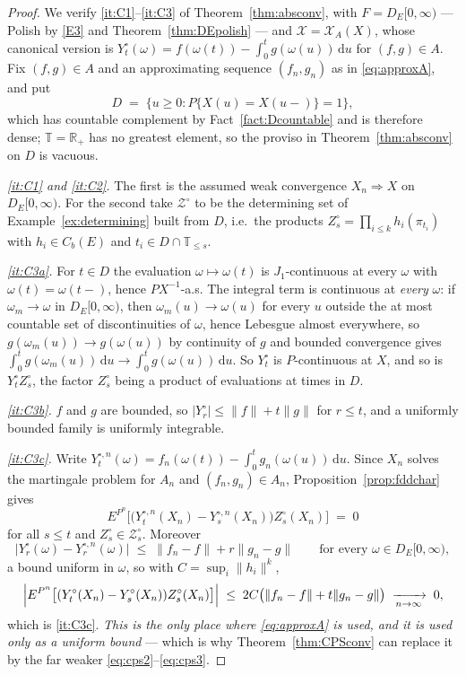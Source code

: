 \documentclass[11pt,a4paper]{article}
\theoremstyle{plain}
\theoremstyle{definition}
\theoremstyle{remark}
\newcommand{\R}{\mathbb{R}}
\newcommand{\Rp}{\R_+}
\newcommand{\T}{\mathbb{T}}                     %
\newcommand{\Cb}{C_b}                          %
\newcommand{\DE}{D_E[0,\infty)}
\newcommand{\XX}{\mathcal{X}}                  %
\newcommand{\ZZ}{\mathcal{Z}}                  %
\newcommand{\dif}{\,\mathrm{d}}
\DeclareMathOperator*{\wto}{\Rightarrow}
\begin{document}
\begin{proof}
  We verify \ref{it:C1}--\ref{it:C3} of Theorem~\ref{thm:absconv}, with
  $F = \DE$ --- Polish by \eqref{E3} and Theorem~\ref{thm:DEpolish} --- and
  $\XX = \XX_A(X)$, whose canonical version is
  $Y^\circ_t(\omega) = f(\omega(t)) - \int_0^t g(\omega(u))\dif u$ for
  $(f,g) \in A$.  Fix $(f,g) \in A$ and an approximating sequence $(f_n,g_n)$ as
  in \eqref{eq:approxA}, and put
  \[
    D \;=\; \{ u \geq 0 : P\{X(u) = X(u-)\} = 1 \} ,
  \]
  which has countable complement by Fact~\ref{fact:Dcountable} and is therefore
  dense; $\T = \Rp$ has no greatest element, so the proviso in
  Theorem~\ref{thm:absconv} on $D$ is vacuous.

  \emph{\ref{it:C1} and \ref{it:C2}.}  The first is the assumed weak convergence
  $X_n \wto X$ on $\DE$.  For the second take $\ZZ^\circ$ to be the determining
  set of Example~\ref{ex:determining} built from $D$, i.e.\ the products
  $Z^\circ_s = \prod_{i \leq k} h_i(\pi_{t_i})$ with $h_i \in \Cb(E)$ and
  $t_i \in D \cap \T_{\leq s}$.

  \emph{\ref{it:C3a}.}  For $t \in D$ the evaluation $\omega \mapsto \omega(t)$ is
  $J_1$-continuous at every $\omega$ with $\omega(t) = \omega(t-)$, hence
  $P X^{-1}$-a.s.  The integral term is continuous at \emph{every} $\omega$: if
  $\omega_m \to \omega$ in $\DE$, then $\omega_m(u) \to \omega(u)$ for every $u$
  outside the at most countable set of discontinuities of $\omega$, hence Lebesgue
  almost everywhere, so $g(\omega_m(u)) \to g(\omega(u))$ by continuity of $g$ and
  bounded convergence gives
  $\int_0^t g(\omega_m(u))\dif u \to \int_0^t g(\omega(u))\dif u$.  So $Y^\circ_t$
  is $P$-continuous at $X$, and so is $Y^\circ_t Z^\circ_s$, the factor
  $Z^\circ_s$ being a product of evaluations at times in $D$.

  \emph{\ref{it:C3b}.}  $f$ and $g$ are bounded, so
  $|Y^\circ_r| \leq \lVert f\rVert + t\lVert g\rVert$ for $r \leq t$, and a
  uniformly bounded family is uniformly integrable.

  \emph{\ref{it:C3c}.}  Write
  $Y^{\circ,n}_t(\omega) = f_n(\omega(t)) - \int_0^t g_n(\omega(u))\dif u$.  Since
  $X_n$ solves the martingale problem for $A_n$ and $(f_n,g_n) \in A_n$,
  Proposition~\ref{prop:fddchar} gives
  \[
    E^{P^n}\bigl[ \bigl( Y^{\circ,n}_t(X_n) - Y^{\circ,n}_s(X_n) \bigr)
      Z^\circ_s(X_n) \bigr] \;=\; 0
  \]
  for all $s \leq t$ and $Z^\circ_s \in \ZZ^\circ_s$.  Moreover
  \[
    \bigl| Y^\circ_r(\omega) - Y^{\circ,n}_r(\omega) \bigr|
      \;\leq\; \lVert f_n - f \rVert + r \lVert g_n - g \rVert
    \qquad \text{for every } \omega \in \DE ,
  \]
  a bound uniform in $\omega$, so with
  $C = \sup_i \lVert h_i\rVert^k$,
  \[
    \Bigl| E^{P^n}\bigl[ (Y^\circ_t(X_n) - Y^\circ_s(X_n)) Z^\circ_s(X_n) \bigr] \Bigr|
      \;\leq\; 2C \bigl( \lVert f_n-f\rVert + t \lVert g_n-g\rVert \bigr)
      \;\xrightarrow[n\to\infty]{}\; 0 ,
  \]
  which is \ref{it:C3c}.  \emph{This is the only place where
  \eqref{eq:approxA} is used, and it is used only as a uniform bound} --- which is
  why Theorem~\ref{thm:CPSconv} can replace it by the far weaker
  \eqref{eq:cps2}--\eqref{eq:cps3}.


\end{proof}
\end{document}
